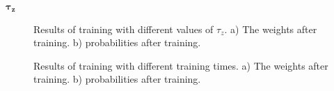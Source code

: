\documentclass[10pt,a4paper]{article}
\begin{document}
$\mathbf{\tau_z}$

\begin{figure}[H]
    \centering
    \qquad
    \caption{Results of training with different values of $\tau_z$. a) The weights after training. b) probabilities after training.}
    \label{fig:off_line_learning_tau_z}%
\end{figure}


\begin{figure}[H]
    \centering
    \qquad
    \caption{Results of training with different training times. a) The weights after training. b) probabilities after training.}
    \label{fig:off_line_learning_tau_z2}%
\end{figure}
\end{document}
